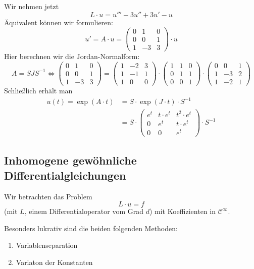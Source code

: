 \documentclass[main.tex]{subfiles}
\begin{document}
\begin{Beispiel}
  Wir nehmen jetzt
  $$L \cdot u = u''' - 3 u'' + 3u' -u$$
  Äquivalent können wir formulieren:
  $$u' = A \cdot u = \begin{pmatrix}
    0 & 1 & 0 \\ 0 & 0 & 1 \\ 1 & -3 & 3
  \end{pmatrix} \cdot u$$
  Hier berechnen wir die Jordan-Normalform:
  $$A = SJS^{-1} \Leftrightarrow
  \begin{pmatrix}
    0 & 1 & 0 \\ 0 & 0 & 1 \\ 1 & -3 & 3
  \end{pmatrix} = \begin{pmatrix}
    1 & -2 & 3 \\ 1 & -1 & 1 \\ 1 & 0 & 0
  \end{pmatrix} \cdot \begin{pmatrix}
    1 & 1 & 0 \\ 0 & 1 & 1 \\ 0 & 0 & 1
  \end{pmatrix} \cdot \begin{pmatrix}
    0 & 0 & 1 \\ 1 & -3 & 2 \\ 1 & -2 & 1
  \end{pmatrix}$$
  Schließlich erhält man
  $$\begin{aligned}
    u(t) = \exp(A \cdot t) & = S \cdot \exp(J \cdot t) \cdot S^{-1} \\
    & = S \cdot \begin{pmatrix}
      e^t & t \cdot e^t & t^2 \cdot e^t \\ 0 & e^t & t \cdot e^t \\ 0 & 0 & e^t
    \end{pmatrix} \cdot S^{-1}
  \end{aligned}$$
\end{Beispiel}

\subsection{Inhomogene gewöhnliche Differentialgleichungen}

Wir betrachten das Problem
$$L \cdot u = f$$
(mit $L$, einem Differentialoperator vom Grad $d$) mit Koeffizienten in $\mathcal{C}^\infty$.

Besonders lukrativ sind die beiden folgenden Methoden:
\begin{enumerate}
  \item Variablenseparation
  \item Variaton der Konstanten
\end{enumerate}
\end{document}
